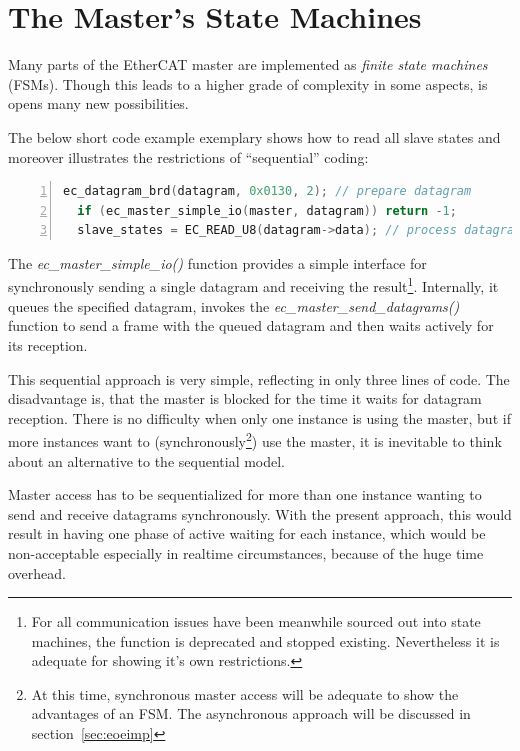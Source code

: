 \documentclass[a4paper,12pt,BCOR6mm,bibtotoc,idxtotoc]{scrbook}
\begin{document}

\section{The Master's State Machines}
\label{sec:fsm}

Many parts of the EtherCAT master are implemented as \textit{finite
  state machines} (FSMs).
Though this leads to a higher grade of complexity in some aspects, is
opens many new possibilities.

The below short code example exemplary shows how to read all slave
states and moreover illustrates the restrictions of ``sequential''
coding:

\begin{lstlisting}[language=C,numbers=left]
  ec_datagram_brd(datagram, 0x0130, 2); // prepare datagram
  if (ec_master_simple_io(master, datagram)) return -1;
  slave_states = EC_READ_U8(datagram->data); // process datagram
\end{lstlisting}

The \textit{ec\_master\_simple\_io()} function provides a simple
interface for synchronously sending a single datagram and receiving
the result\footnote{For all communication issues have been meanwhile
  sourced out into state machines, the function is deprecated and
  stopped existing. Nevertheless it is adequate for showing it's own
  restrictions.}. Internally, it queues the specified datagram,
invokes the \textit{ec\_master\_send\_datagrams()} function to send a
frame with the queued datagram and then waits actively for its
reception.

This sequential approach is very simple, reflecting in only three
lines of code. The disadvantage is, that the master is blocked for the
time it waits for datagram reception. There is no difficulty when only
one instance is using the master, but if more instances want to
(synchronously\footnote{At this time, synchronous master access will
  be adequate to show the advantages of an FSM. The asynchronous
  approach will be discussed in section~\ref{sec:eoeimp}}) use the
master, it is inevitable to think about an alternative to the
sequential model.

Master access has to be sequentialized for more than one instance
wanting to send and receive datagrams synchronously. With the present
approach, this would result in having one phase of active waiting for
each instance, which would be non-acceptable especially in realtime
circumstances, because of the huge time overhead.
\end{document}
